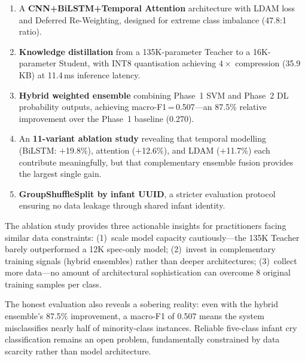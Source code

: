 \documentclass[11pt,a4paper]{article}
\begin{document}
\begin{enumerate}[nosep]
  \item A \textbf{CNN+BiLSTM+Temporal Attention} architecture with
        LDAM loss and Deferred Re-Weighting, designed for extreme
        class imbalance (47.8:1 ratio).
  \item \textbf{Knowledge distillation} from a 135K-parameter Teacher
        to a 16K-parameter Student, with INT8 quantisation achieving
        $4\times$ compression (35.9\,KB) at 11.4\,ms inference latency.
  \item \textbf{Hybrid weighted ensemble} combining Phase~1 SVM and
        Phase~2 DL probability outputs, achieving
        macro-F1\,=\,0.507---an 87.5\% relative improvement over the
        Phase~1 baseline (0.270).
  \item An \textbf{11-variant ablation study} revealing that temporal
        modelling (BiLSTM: $+$19.8\%), attention ($+$12.6\%), and LDAM
        ($+$11.7\%) each contribute meaningfully, but that
        complementary ensemble fusion provides the largest single gain.
  \item \textbf{GroupShuffleSplit by infant UUID}, a stricter evaluation
        protocol ensuring no data leakage through shared infant identity.
\end{enumerate}

The ablation study provides three actionable insights for practitioners
facing similar data constraints: (1)~scale model capacity cautiously---the
135K Teacher barely outperformed a 12K spec-only model;
(2)~invest in complementary training signals (hybrid ensembles) rather
than deeper architectures; (3)~collect more data---no amount of
architectural sophistication can overcome 8 original training samples
per class.

The honest evaluation also reveals a sobering reality: even with the
hybrid ensemble's 87.5\% improvement, a macro-F1 of 0.507 means the
system misclassifies nearly half of minority-class instances. Reliable
five-class infant cry classification remains an open problem,
fundamentally constrained by data scarcity rather than model
architecture.
\end{document}
